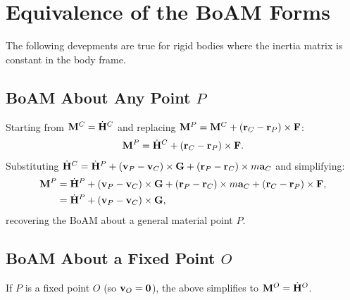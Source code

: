 \documentclass[
  letterpaper,
  DIV=11,
  numbers=noendperiod]{scrreprt}
\begin{document}
\section{Equivalence of the BoAM
Forms}\label{equivalence-of-the-boam-forms}

The following devepments are true for rigid bodies where the inertia
matrix is constant in the body frame.

\subsection{\texorpdfstring{BoAM About Any Point
\(P\)}{BoAM About Any Point P}}\label{boam-about-any-point-p}

Starting from \({\bf M}^C = \dot{\bf H}^C\) and replacing
\({\bf M}^P = {\bf M}^C+({\bf r}_C-{\bf r}_P)\times{\bf F}\):
\begin{align}
    {\bf M}^P = \dot{\bf H}^C+({\bf r}_C-{\bf r}_P)\times{\bf F}.
\end{align} Substituting
\(\dot{\bf H}^C = \dot{\bf H}^P+({\bf v}_P-{\bf v}_C)\times{\bf G}+({\bf r}_P-{\bf r}_C)\times m{\bf a}_C\)
and simplifying: \begin{align}
    \begin{split}
        {\bf M}^P &= \dot{\bf H}^P+({\bf v}_P-{\bf v}_C)\times{\bf G}+({\bf r}_P-{\bf r}_C)\times m{\bf a}_C+({\bf r}_C-{\bf r}_P)\times{\bf F},\\
        &= \dot{\bf H}^P+({\bf v}_P-{\bf v}_C)\times{\bf G},
    \end{split}
\end{align} recovering the BoAM about a general material point \(P\).

\subsection{\texorpdfstring{BoAM About a Fixed Point
\(O\)}{BoAM About a Fixed Point O}}\label{boam-about-a-fixed-point-o}

If \(P\) is a fixed point \(O\) (so \({\bf v}_O = {\bf 0}\)), the above
simplifies to \({\bf M}^O = \dot{\bf H}^O\).
\end{document}
